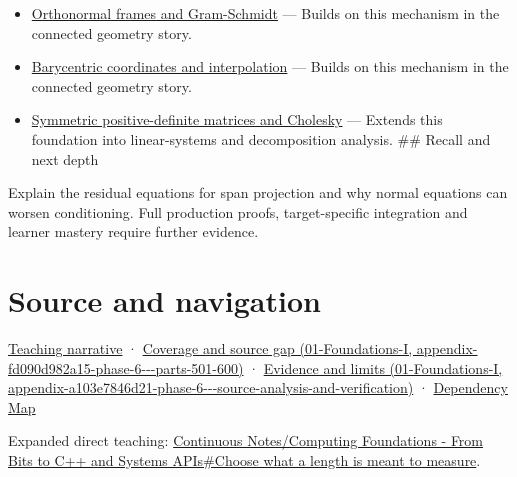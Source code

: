 \begin{itemize}
\tightlist
\item
  \hyperref[appendix-c39f1ed34271]{Orthonormal frames and Gram-Schmidt} --- Builds on this mechanism in the connected geometry story.
\item
  \hyperref[appendix-02b9d9a81dca]{Barycentric coordinates and interpolation} --- Builds on this mechanism in the connected geometry story.
\item
  \hyperref[appendix-50d2ea3c9b26]{Symmetric positive-definite matrices and Cholesky} --- Extends this foundation into linear-systems and decomposition analysis. \#\# Recall and next depth
\end{itemize}

Explain the residual equations for span projection and why normal equations can worsen conditioning. Full production proofs, target-specific integration and learner mastery require further evidence.

\section{Source and navigation}\label{appendix-3b863809f82a-source-and-navigation}

\href{Continuous\%20Notes/Computing\%20Foundations\%20-\%20From\%20Bits\%20to\%20C++\%20and\%20Systems\%20APIs\#A\%20Gram\%20matrix\%20remembers\%20the\%20geometry\%20of\%20a\%20slanted\%20basis}{Teaching narrative} · \href{../01-Foundations-I/main.pdf\#nameddest=appendix-fd090d982a15-phase-6---parts-501-600}{Coverage and source gap (01-Foundations-I, appendix-fd090d982a15-phase-6-\/-\/-parts-501-600)} · \href{../01-Foundations-I/main.pdf\#nameddest=appendix-a103e7846d21-phase-6---source-analysis-and-verification}{Evidence and limits (01-Foundations-I, appendix-a103e7846d21-phase-6-\/-\/-source-analysis-and-verification)} · \hyperref[appendix-4ad47bdd269a]{Dependency Map}

Expanded direct teaching: \href{Continuous\%20Notes/Computing\%20Foundations\%20-\%20From\%20Bits\%20to\%20C++\%20and\%20Systems\%20APIs\#Choose\%20what\%20a\%20length\%20is\%20meant\%20to\%20measure}{Continuous Notes/Computing Foundations - From Bits to C++ and Systems APIs\#Choose what a length is meant to measure}.
